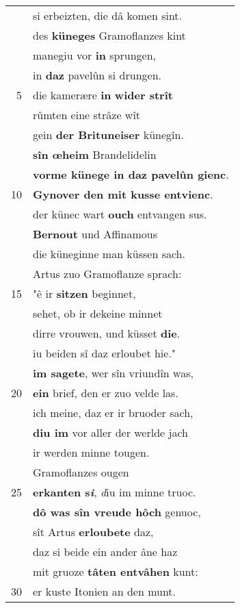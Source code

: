 \documentclass[8pt,a4paper,notitlepage]{article}
\begin{document}
\begin{table}[ht]
\begin{minipage}[t]{0.5\linewidth}
\begin{center}
\end{center}
\begin{tabular}{rl}
 & si erbeizten, die dâ komen sint.\\ 
 & des \textbf{küneges} Gramoflanzes kint\\ 
 & manegiu vor \textbf{in} sprungen,\\ 
 & in \textbf{daz} pavelûn si drungen.\\ 
5 & die kamerære \textbf{in} \textbf{wider strît}\\ 
 & rûmten eine strâze wît\\ 
 & gein \textbf{der Brituneiser} künegîn.\\ 
 & \textbf{sîn œheim} Brandelidelin\\ 
 & \textbf{vorme künege in daz pavelûn gienc}.\\ 
10 & \textbf{Gynover den mit kusse entvienc}.\\ 
 & der künec wart \textbf{ouch} entvangen sus.\\ 
 & \textbf{Bernout} und Affinamous\\ 
 & die küneginne man küssen sach.\\ 
 & Artus zuo Gramoflanze sprach:\\ 
15 & "ê ir \textbf{sitzen} beginnet,\\ 
 & sehet, ob ir dekeine minnet\\ 
 & dirre vrouwen, und küsset \textbf{die}.\\ 
 & iu beiden sî daz erloubet hie."\\ 
 & \textbf{im sagete}, wer sîn vriundîn was,\\ 
20 & \textbf{ein} brief, den er zuo velde las.\\ 
 & ich meine, daz er ir bruoder sach,\\ 
 & \textbf{diu im} vor aller der werlde jach\\ 
 & ir werden minne tougen.\\ 
 & Gramoflanzes ougen\\ 
25 & \textbf{erkanten s\textit{i}}, \textit{d}iu im minne truoc.\\ 
 & \textbf{dô was sîn vreude hôch} genuoc,\\ 
 & sît Artus \textbf{erloubete} daz,\\ 
 & daz si beide ein ander âne haz\\ 
 & mit gruoze \textbf{tâten entvâhen} kunt:\\ 
30 & er kuste Itonien an den munt.\\ 
\end{tabular}

\end{minipage}
\end{table}
\end{document}
